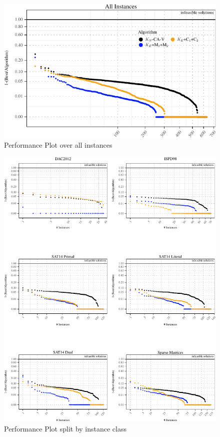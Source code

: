 \documentclass[a4paper,12pt,titlepage, BCOR7mm,headsepline]{scrbook}
\numberwithin{equation}{section}
\begin{document}

\begin{figure}[H]
\begin{center}
\includegraphics[width=\textwidth]{rnw/tuning_subset_plots/performance_plot_main-1}
\caption{Performance Plot over all instances}
\label{fig:performanceplot}
\end{center}
\end{figure}



\begin{figure}[H]
\begin{center}
\includegraphics[width=\textwidth]{rnw/tuning_subset_plots/class_performance_plot-1}
\caption{Performance Plot split by instance class}
\label{fig:performanceplotclasses}
\end{center}
\end{figure}
\end{document}
